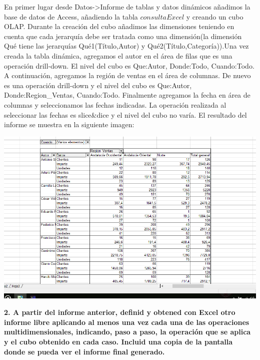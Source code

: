 \documentclass[paper=a4, fontsize=11pt, spanish]{scrartcl}
\numberwithin{equation}{section} %
\numberwithin{figure}{section} %
\numberwithin{table}{section} %
\begin{document}
En primer lugar desde Datos->Informe de tablas y datos dinámicos añadimos la base de datos de Access, añadiendo la tabla $consultaExcel$ y creando un cubo OLAP. Durante la creación del cubo añadimos las dimensiones teniendo en cuenta que cada jerarquía debe ser tratada como una dimensión(la dimensión Qué tiene las jerarquías Qué1(Título,Autor) y Qué2(Título,Categoría)).Una vez creada la tabla dinámica, agregamos el autor en el área de filas que es una operación drill-down. El nivel del cubo es Que:Autor, Donde:Todo, Cuando:Todo. A continuación, agregamos la región de ventas en el área de columnas. De nuevo es una operación drill-down y el nivel del cubo es Que:Autor, Donde:Region\_Ventas, Cuando:Todo. Finalmente agregamos la fecha en área de columnas y seleccionamos las fechas indicadas. La operación realizada al seleccionar las fechas es slice\&dice y el nivel del cubo no varía.
\newline
El resultado del informe se muestra en la siguiente imagen:
\begin{center}
	\includegraphics[scale=0.5]{img1.png}
\end{center}
\bigskip
\textbf{2. A partir del informe anterior, definid y obtened con Excel otro informe libre aplicando al menos una vez cada una de las operaciones multidimensionales, indicando, paso a paso, la operación que se aplica y el cubo obtenido en cada caso.
Incluid una copia de la pantalla donde se pueda ver el informe final generado.\\}
\end{document}
